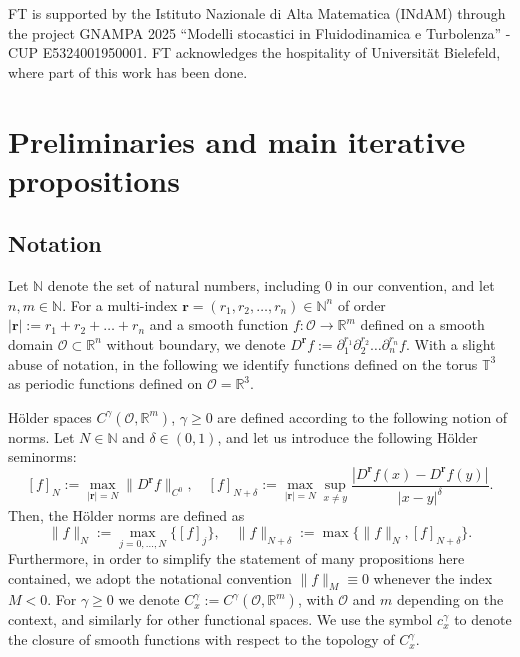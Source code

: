 \documentclass[10pt,a4paper]{amsart}
\numberwithin{equation}{section}
\numberwithin{corollario}{section}
\numberwithin{lemma}{section}
\numberwithin{prop}{section}
\theoremstyle{definition}
\theoremstyle{remark}
\newcommand{\N}{\mathbb{N}}
\newcommand{\R}{\mathbb{R}}
\newcommand{\T}{\mathbb{T}}
\begin{document}
FT is supported by the Istituto Nazionale di
Alta Matematica (INdAM) through the project GNAMPA 2025 “Modelli stocastici in Fluidodinamica
e Turbolenza” -CUP E5324001950001.
FT acknowledges the hospitality of Universit\"at Bielefeld, where part of this work has been done.

\section{Preliminaries and main iterative propositions} \label{sec:prelimi}

\subsection{Notation}
Let $\N$ denote the set of natural numbers, including $0$ in our convention, and let $n,m \in \N$. For a multi-index $\mathbf{r} = (r_1,r_2,\dots,r_n) \in \N^n$ of order $|\mathbf{r}|:= r_1 + r_2 + \dots+ r_n$ and a smooth function $f:\mathcal{O} \to \R^m$ defined on a smooth domain $\mathcal{O} \subset \R^n$ without boundary, we denote $D^{\mathbf{r}}f := \partial_{1}^{r_1} \partial_2^{r_2} \dots \partial_n^{r_n} f$.
With a slight abuse of notation, in the following we identify functions defined on the torus $\T^3$ as periodic functions defined on $\mathcal{O}=\R^3$.

H\"older spaces $C^\gamma(\mathcal{O},\R^m)$, $\gamma \geq 0$ are defined according to the following notion of norms.
Let $N\in \N$ and $\delta \in (0,1)$, and let us introduce the following H\"older  seminorms:
\[[f]_N := \max\limits_{|\mathbf{r}|=N}\|D^{\mathbf{r}}f\|_{C^0},
\quad 
[f]_{N+\delta}:=\max\limits_{|\mathbf{r}|=N}\sup\limits_{x\neq y}\frac{|D^{\mathbf{r}}f(x)-D^{\mathbf{r}}f(y)|}{|x-y|^\delta}.\]
Then, the H\"older norms are defined as
\[\|f\|_N:=\max_{j=0,\dots,N}\{[f]_j\},
\quad 
\|f\|_{N+\delta}:= \max\{\|f\|_{N},[f]_{N+\delta}\}.\]
Furthermore, in order to simplify the statement of many propositions here contained, we adopt the notational convention $\| f \|_M \equiv 0$ whenever the index $M<0$. 
For $\gamma \geq 0$ we denote $C^\gamma_x := C^\gamma(\mathcal{O},\R^m)$, with $\mathcal{O}$ and $m$ depending on the context, and similarly for other functional spaces.
We use the symbol $c^\gamma_x$ to denote the closure of smooth functions with respect to the topology of $C^\gamma_x$.
\end{document}
